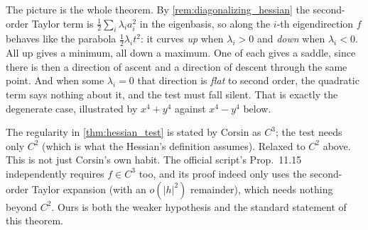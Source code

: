\begin{center}
\end{center}

The picture is the whole theorem. By \cref{rem:diagonalizing_hessian} the second-order Taylor
term is $\tfrac12\sum_i\lambda_ia_i^2$ in the eigenbasis, so along the $i$-th eigendirection $f$
behaves like the parabola $\tfrac12\lambda_it^2$: it curves \emph{up} when $\lambda_i>0$ and
\emph{down} when $\lambda_i<0$. All up gives a minimum, all down a maximum. One of each gives a
saddle, since there is then a direction of ascent and a direction of descent through the same
point. And when some $\lambda_i = 0$ that direction is \emph{flat} to second order, the
quadratic term says nothing about it, and the test must fall silent. That is exactly the
degenerate case, illustrated by $x^4+y^4$ against $x^4-y^4$ below.

\begin{ainote}
The regularity in \cref{thm:hessian_test} is stated by Corsin as $C^3$; the test needs only
$C^2$ (which is what the Hessian's definition assumes). Relaxed to $C^2$ above. This is not just
Corsin's own habit. The official script's Prop.\ 11.15 independently requires $f \in C^3$ too,
and its proof indeed only uses the second-order Taylor expansion (with an $o(\lvert h\rvert^2)$
remainder), which needs nothing beyond $C^2$. Ours is both the weaker hypothesis and the
standard statement of this theorem.
\end{ainote}


